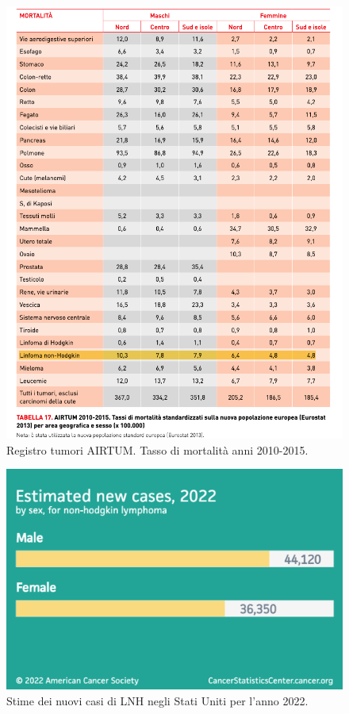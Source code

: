 \begin{figure}[H]
    \begin{center}
    \includegraphics[width=0.8\columnwidth]{img/MORTALITA.png}
    \end{center}
    \caption[Registro tumori AIRTUM. Tasso di mortalità anni 2010-2015.]{Registro tumori AIRTUM. Tasso di mortalità anni 2010-2015.
    \cite{img7}}

\end{figure}

\begin{figure}[H]
    \begin{center}
    \includegraphics[width=0.5\columnwidth]{img/Estimatednewcases2022.png}
    \end{center}
    \caption[Stime dei nuovi casi di LNH negli Stati Uniti per l’anno 2022.]{Stime dei nuovi casi di LNH negli Stati Uniti per l’anno 2022.
    \cite{img8}}

\end{figure}

